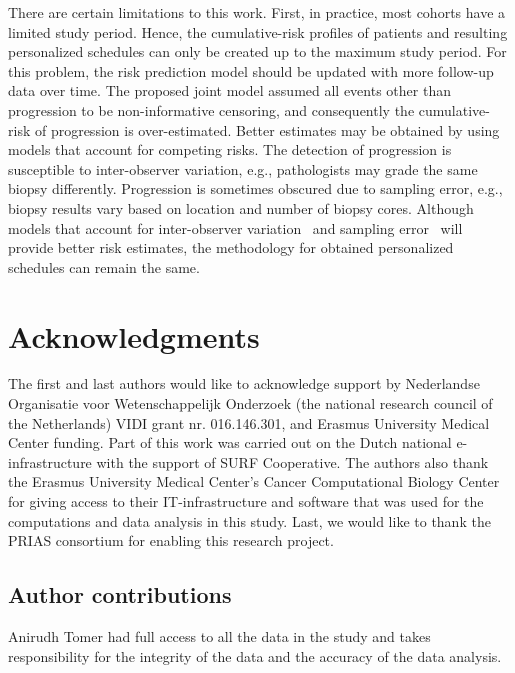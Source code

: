 \documentclass[AMA,STIX1COL]{WileyNJD-v2}
\begin{document}
There are certain limitations to this work. First, in practice, most cohorts have a limited study period. Hence, the cumulative-risk profiles of patients and resulting personalized schedules can only be created up to the maximum study period. For this problem, the risk prediction model should be updated with more follow-up data over time. The proposed joint model assumed all events other than progression to be non-informative censoring, and consequently the cumulative-risk of progression is over-estimated. Better estimates may be obtained by using models that account for competing risks. The detection of progression is susceptible to inter-observer variation, e.g., pathologists may grade the same biopsy differently. Progression is sometimes obscured due to sampling error, e.g., biopsy results vary based on location and number of biopsy cores. Although models that account for inter-observer variation~\citep{balasubramanian2003estimation} and sampling error~\citep{coley2017prediction} will provide better risk estimates, the methodology for obtained personalized schedules can remain the same.



\section*{Acknowledgments}
The first and last authors would like to acknowledge support by Nederlandse Organisatie voor Wetenschappelijk Onderzoek (the national research council of the Netherlands) VIDI grant nr. 016.146.301, and Erasmus University Medical Center funding. Part of this work was carried out on the Dutch national e-infrastructure with the support of SURF Cooperative. The authors also thank the Erasmus University Medical Center's Cancer Computational Biology Center for giving access to their IT-infrastructure and software that was used for the computations and data analysis in this study. Last, we would like to thank the PRIAS consortium for enabling this research project.

\subsection*{Author contributions}
Anirudh Tomer had full access to all the data in the study and takes responsibility for the integrity of the data and the accuracy of the data analysis.
\end{document}
